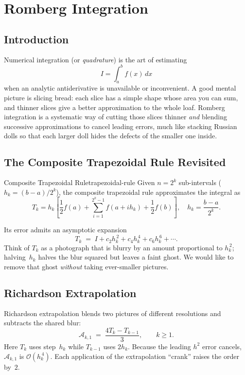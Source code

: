 \chapter{Romberg Integration}
\label{chap:romberg}


\section*{Introduction}
Numerical integration (or \emph{quadrature}) is the art of estimating
\[
  I = \int_a^b f(x)\,dx
\]
when an analytic antiderivative is unavailable or inconvenient.
A good mental picture is slicing bread:
each slice has a simple shape whose area you can sum, and thinner slices
give a better approximation to the whole loaf.
Romberg integration is a systematic way of cutting those slices thinner
\emph{and} blending successive approximations to cancel leading errors,
much like stacking Russian dolls so that each larger doll hides the defects
of the smaller one inside.


\section{The Composite Trapezoidal Rule Revisited}
\label{sec:trapezoid}
\begin{definition}{Composite Trapezoidal Rule}{trapezoidal-rule}
  Given $n=2^k$ sub-intervals (\(h_k = (b-a)/2^{k}\)), the composite trapezoidal rule approximates the integral as
  \begin{equation}
    T_k = h_k\left[\frac12 f(a) +\sum_{i=1}^{2^{k}-1} f(a+i h_k) + \frac12 f(b)\right],
    \quad
    h_k = \frac{b-a}{2^{k}}.
  \end{equation}
\end{definition}
Its error admits an asymptotic expansion
\[
  T_k \;=\; I
  + c_2 h_k^{\,2}
  + c_4 h_k^{\,4}
  + c_6 h_k^{\,6}
  + \cdots .
\]
Think of $T_k$ as a photograph that is blurry by an amount proportional
to $h_k^{\,2}$; halving~$h_k$ halves the blur squared but leaves a faint
ghost.  We would like to remove that ghost \emph{without} taking ever-smaller
pictures.


\section{Richardson Extrapolation}
Richardson extrapolation blends two pictures of different resolutions
and subtracts the shared blur:
\[
  \mathcal{A}_{k,1}
  \;=\;
  \frac{4 T_{k} - T_{k-1}}{3},
  \qquad k\ge 1.
\]
Here $T_{k}$ uses step~$h_k$ while $T_{k-1}$ uses $2h_k$.
Because the leading $h^{2}$ error cancels,
$\mathcal{A}_{k,1}$ is \(\mathcal{O}(h_k^{\,4})\).
Each application of the extrapolation ``crank'' raises the order by~\(2\).



